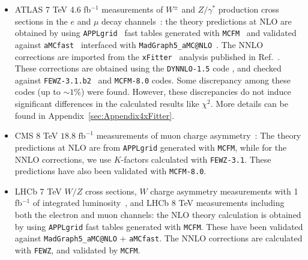 \begin{itemize}
\item ATLAS 7 TeV 4.6 fb$^{-1}$ measurements of $W^{\pm}$ and $Z/\gamma^{*}$ production cross 
sections in the $e$ and $\mu$ decay channels~\cite{Aaboud:2016btc}: 
the theory predictions at NLO are obtained by using \texttt{APPLgrid}~\cite{Carli:2010rw} fast tables 
generated with \texttt{MCFM}~\cite{Campbell:2010ff} and validated against \texttt{aMCfast}~\cite{Bertone:2014zva} 
interfaced with \texttt{MadGraph5\_aMC@NLO}~\cite{Alwall:2014hca}. The NNLO corrections are imported from the 
\texttt{xFitter}~\cite{Alekhin:2014irh} analysis published in Ref.~\cite{Aaboud:2016btc}. These corrections are 
obtained using the \texttt{DYNNLO-1.5} code  \cite{Catani:2007vq,Catani:2009sm}, and checked against  \texttt{FEWZ-3.1.b2}~\cite{Gavin:2010az,Gavin:2012sy,Li:2012wna} and \texttt{MCFM-8.0} \cite{Boughezal:2016wmq} codes. Some discrepancy among these codes (up to $\sim\!1\%$) were found. However,  
these discrepancies do not induce significant differences
in the calculated results like $\chi^2$. More details can be found in Appendix~\ref{sec:Appendix4xFitter}.


\item CMS 8 TeV 
$18.8 \mbox{ fb}^{-1}$ measurements of muon charge asymmetry~\cite{Khachatryan:2016pev}: 
The theory predictions at NLO are from \texttt{APPLgrid} generated with \texttt{MCFM}, while for the NNLO 
corrections, we use $K$-factors calculated with \texttt{FEWZ-3.1}. These predictions have also been validated with \texttt{MCFM-8.0}. 

\item LHCb 7 TeV $W/Z$ cross sections, $W$ charge asymmetry measurements with 1 fb$^{-1}$ of integrated luminosity~\cite{Aaij:2015gna}, 
and LHCb 8 TeV measurements including both the electron \cite{Aaij:2015vua} and muon \cite{Aaij:2015zlq} channels: 
the NLO theory calculation is obtained by using \texttt{APPLgrid} fast tables generated with \texttt{MCFM}. 
These have been validated against \texttt{MadGraph5\_aMC@NLO} + \texttt{aMCfast}. The NNLO corrections are calculated with  \texttt{FEWZ}, and validated by \texttt{MCFM}.


\end{itemize}
